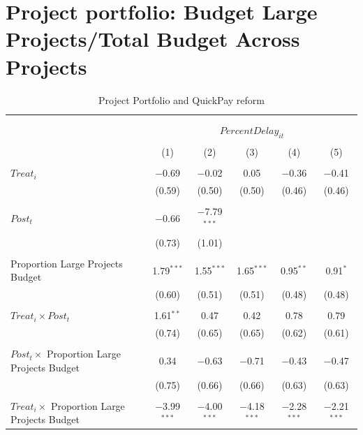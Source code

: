 \documentclass[
]{article}
\begin{document}
\hypertarget{project-portfolio-budget-large-projectstotal-budget-across-projects}{%
\section{Project portfolio: Budget Large Projects/Total Budget Across
Projects}\label{project-portfolio-budget-large-projectstotal-budget-across-projects}}

\begin{table}[H] \centering 
  \caption{Project Portfolio and QuickPay reform} 
  \label{} 
\small 
\begin{tabular}{@{\extracolsep{-2pt}}lccccc} 
\\[-1.8ex]\hline 
\hline \\[-1.8ex] 
\\[-1.8ex] & \multicolumn{5}{c}{$PercentDelay_{it}$  } \\ 
\\[-1.8ex] & (1) & (2) & (3) & (4) & (5)\\ 
\hline \\[-1.8ex] 
 $Treat_i$ & $-$0.69 & $-$0.02 & 0.05 & $-$0.36 & $-$0.41 \\ 
  & (0.59) & (0.50) & (0.50) & (0.46) & (0.46) \\ 
  & & & & & \\ 
 $Post_t$ & $-$0.66 & $-$7.79$^{***}$ &  &  &  \\ 
  & (0.73) & (1.01) &  &  &  \\ 
  & & & & & \\ 
 Proportion Large Projects Budget & 1.79$^{***}$ & 1.55$^{***}$ & 1.65$^{***}$ & 0.95$^{**}$ & 0.91$^{*}$ \\ 
  & (0.60) & (0.51) & (0.51) & (0.48) & (0.48) \\ 
  & & & & & \\ 
 $Treat_i \times Post_t$  & 1.61$^{**}$ & 0.47 & 0.42 & 0.78 & 0.79 \\ 
  & (0.74) & (0.65) & (0.65) & (0.62) & (0.61) \\ 
  & & & & & \\ 
 $Post_t \times$ Proportion Large Projects Budget & 0.34 & $-$0.63 & $-$0.71 & $-$0.43 & $-$0.47 \\ 
  & (0.75) & (0.66) & (0.66) & (0.63) & (0.63) \\ 
  & & & & & \\ 
 $Treat_i \times$ Proportion Large Projects Budget & $-$3.99$^{***}$ & $-$4.00$^{***}$ & $-$4.18$^{***}$ & $-$2.28$^{***}$ & $-$2.21$^{***}$ \\ 

\end{tabular}
\end{table}
\end{document}
